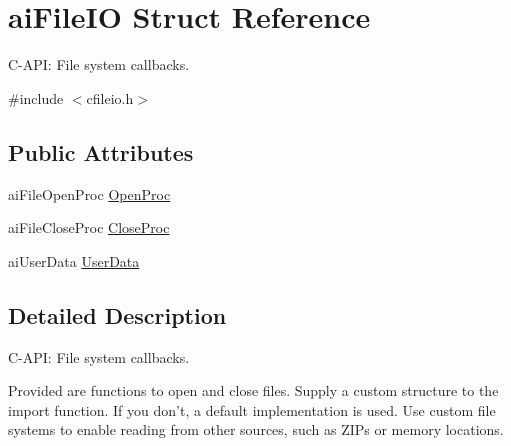 \hypertarget{structaiFileIO}{\section{ai\-File\-I\-O \-Struct \-Reference}
\label{structaiFileIO}
}


\-C-\/\-A\-P\-I\-: \-File system callbacks.  




{\ttfamily \#include $<$cfileio.\-h$>$}

\subsection*{\-Public \-Attributes}
\begin{DoxyCompactItemize}
\item 
ai\-File\-Open\-Proc \hyperlink{structaiFileIO_a819d9c7823039294125068d06949a6df}{\-Open\-Proc}
\item 
ai\-File\-Close\-Proc \hyperlink{structaiFileIO_a7ec702672712b5a02dc49cb17f980a14}{\-Close\-Proc}
\item 
ai\-User\-Data \hyperlink{structaiFileIO_a9c62b7f3d70fbb2f41e33ad0b9933139}{\-User\-Data}
\end{DoxyCompactItemize}


\subsection{\-Detailed \-Description}
\-C-\/\-A\-P\-I\-: \-File system callbacks. 

\-Provided are functions to open and close files. \-Supply a custom structure to the import function. \-If you don't, a default implementation is used. \-Use custom file systems to enable reading from other sources, such as \-Z\-I\-Ps or memory locations. 

